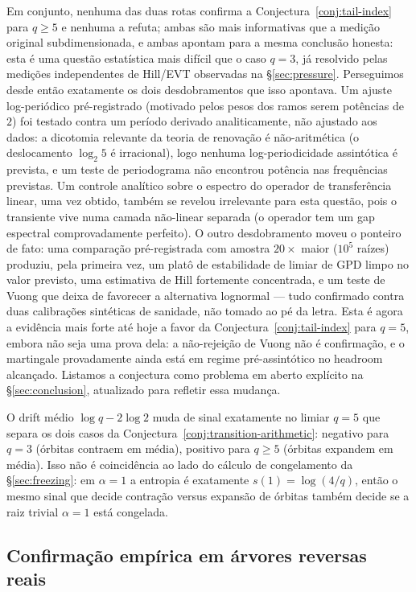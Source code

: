 \documentclass[11pt]{article}
\theoremstyle{definition}
\theoremstyle{remark}
\begin{document}
Em conjunto, nenhuma das duas rotas confirma a
Conjectura~\ref{conj:tail-index} para $q\ge5$ e nenhuma a refuta; ambas
são mais informativas que a medição original subdimensionada, e ambas
apontam para a mesma conclusão honesta: esta é uma questão estatística
mais difícil que o caso $q=3$, já resolvido pelas medições
independentes de Hill/EVT observadas na \S\ref{sec:pressure}.
Perseguimos desde então exatamente os dois desdobramentos que isso
apontava. Um ajuste log-periódico pré-registrado (motivado pelos pesos
dos ramos serem potências de $2$) foi testado contra um período
derivado analiticamente, não ajustado aos dados: a dicotomia relevante
da teoria de renovação é não-aritmética (o deslocamento $\log_2 5$ é
irracional), logo nenhuma log-periodicidade assintótica é prevista, e
um teste de periodograma não encontrou potência nas frequências
previstas. Um controle analítico sobre o espectro do operador de
transferência linear, uma vez obtido, também se revelou irrelevante
para esta questão, pois o transiente vive numa camada não-linear
separada (o operador tem um gap espectral comprovadamente perfeito). O
outro desdobramento moveu o ponteiro de fato: uma comparação
pré-registrada com amostra $20\times$ maior ($10^5$ raízes) produziu,
pela primeira vez, um platô de estabilidade de limiar de GPD limpo no
valor previsto, uma estimativa de Hill fortemente concentrada, e um
teste de Vuong que deixa de favorecer a alternativa lognormal --- tudo
confirmado contra duas calibrações sintéticas de sanidade, não tomado
ao pé da letra. Esta é agora a evidência mais forte até hoje a favor da
Conjectura~\ref{conj:tail-index} para $q=5$, embora não seja uma prova
dela: a não-rejeição de Vuong não é confirmação, e o martingale
provadamente ainda está em regime pré-assintótico no headroom
alcançado. Listamos a conjectura como problema em aberto explícito na
\S\ref{sec:conclusion}, atualizado para refletir essa mudança.

O drift médio $\log q - 2\log 2$ muda de sinal exatamente no limiar
$q=5$ que separa os dois casos da Conjectura~\ref{conj:transition-arithmetic}:
negativo para $q=3$ (órbitas contraem em média), positivo para $q\ge5$
(órbitas expandem em média). Isso não é coincidência ao lado do cálculo
de congelamento da \S\ref{sec:freezing}: em $\alpha=1$ a entropia é
exatamente $s(1)=\log(4/q)$, então o mesmo sinal que decide contração
versus expansão de órbitas também decide se a raiz trivial $\alpha=1$
está congelada.

\subsection{Confirmação empírica em árvores reversas reais}
\label{sec:kl-empirical}
\end{document}
